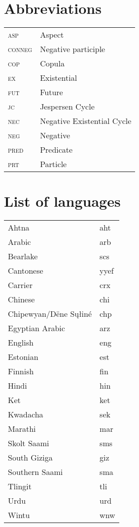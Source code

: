 ﻿\documentclass[output=paper]{langsci/langscibook}
\begin{document}
\section*{Abbreviations}

\begin{tabularx}{\textwidth}{@{} l l @{}}
\textsc{asp}    &Aspect\\
\textsc{conneg} &Negative participle\\ 
\textsc{cop}    &Copula\\
\textsc{ex}     &Existential\\
\textsc{fut}    &Future\\
\textsc{jc}     &Jespersen Cycle\\ 
\textsc{nec}    &Negative Existential Cycle\\ 
\textsc{neg}    &Negative\\ 
\textsc{pred}   &Predicate\\
\textsc{prt}    &Particle
\end{tabularx}

\section*{List of languages}

\begin{tabularx}{\textwidth}{@{} l l @{}}
Ahtna           &aht\\ 
Arabic          &arb \\
Bearlake        &scs \\
Cantonese       &yyef \\
Carrier         &crx \\
Chinese         &chi \\
Chipewyan\slash Dëne S\k{u}łiné  &chp\\
Egyptian Arabic    &arz\\
English         &eng\\
Estonian        &est \\
Finnish         &fin\\
Hindi           &hin\\
Ket             &ket\\
Kwadacha        &sek\\
Marathi         &mar\\
Skolt Saami     &sms\\
South Giziga    &giz\\
Southern Saami    &sma\\
Tlingit         &tli\\
Urdu            &urd\\
Wintu           &wnw
\end{tabularx}
\end{document}

